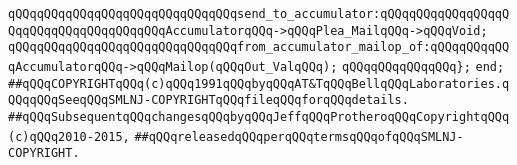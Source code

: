 \newline
\verb|qQQqqQQqqQQqqQQqqQQqqQQqqQQqqQQqsend_to_accumulator:qQQqqQQqqQQqqQQqqQQqqQQqqQQqqQQqqQQqqQQqAccumulatorqQQq->qQQqPlea_MailqQQq->qQQqVoid;|\newline
\verb|qQQqqQQqqQQqqQQqqQQqqQQqqQQqqQQqfrom_accumulator_mailop_of:qQQqqQQqqQQqAccumulatorqQQq->qQQqMailop(qQQqOut_ValqQQq);|\newline
\newline
\verb|qQQqqQQqqQQqqQQq};|\newline
\newline
\verb|end;|\newline
\newline
\verb|##qQQqCOPYRIGHTqQQq(c)qQQq1991qQQqbyqQQqAT&TqQQqBellqQQqLaboratories.qQQqqQQqSeeqQQqSMLNJ-COPYRIGHTqQQqfileqQQqforqQQqdetails.|\newline
\verb|##qQQqSubsequentqQQqchangesqQQqbyqQQqJeffqQQqProtheroqQQqCopyrightqQQq(c)qQQq2010-2015,|\newline
\verb|##qQQqreleasedqQQqperqQQqtermsqQQqofqQQqSMLNJ-COPYRIGHT.|\newline

